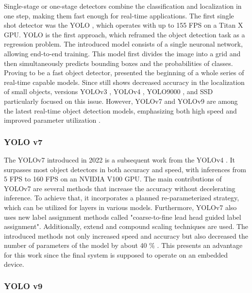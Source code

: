 Single-stage or one-stage detectors combine the classification and localization in one step, making them fast enough for real-time applications.
The first single shot detector was the \ac{YOLO} \cite{YOLOv1}, which operates with up to 155 FPS on a Titan X GPU.
\ac{YOLO} is the first approach, which reframed the object detection task as a regression problem.
The introduced model consists of a single neuronal network, allowing end-to-end training.
This model first divides the image into a grid and then simultaneously predicts bounding boxes and the probabilities of classes.
Proving to be a fast object detector, \cite{YOLOv1} presented the beginning of a whole series of real-time capable models.
Since \cite{YOLOv1} still shows decreased accuracy in the localization of small objects, versions \ac{YOLO}v3 \cite{yolov3}, \ac{YOLO}v4 \cite{yolov4}, \ac{YOLO}9000 \cite{yolo9000}, and \ac{SSD} \cite{SSD_model} particularly focused on this issue.
However, \ac{YOLO}v7 \cite{yolov7} and \ac{YOLO}v9 \cite{YOLOv9} are among the latest real-time object detection models, emphasizing both high speed and improved parameter utilization \cite{20yearsSurvey, surveyObjectDetection, surveyObjectDetection2019, realTimeObjectDetection}.

\clearpage

\subsubsection{YOLO v7}
\label{subsubsec:YOLOv7}

The \ac{YOLO}v7 \cite{yolov7} introduced in 2022 is a subsequent work from the \ac{YOLO}v4 \cite{yolov4}.
It surpasses most object detectors in both accuracy and speed, with inferences from 5 FPS to 160 FPS on an NVIDIA V100 GPU.
The main contributions of \ac{YOLO}v7 \cite{yolov7} are several methods that increase the accuracy without decelerating inference.
To achieve that, it incorporates a planned re-parameterized strategy, which can be utilized for layers in various models.
Furthermore, \ac{YOLO}v7 \cite{yolov7} also uses new label assignment methods called "coarse-to-fine lead head guided label assignment".
Additionally, extend and compound scaling techniques are used.
The introduced methods not only increased speed and accuracy but also decreased the number of parameters of the model by about 40 \% \cite{yolov7}.
This presents an advantage for this work since the final system is supposed to operate on an embedded device.

\subsubsection{YOLO v9}
\label{subsubsec:YOLOv9}

